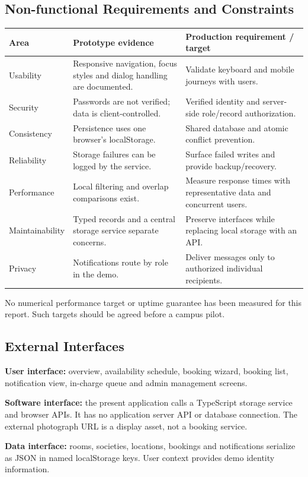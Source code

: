 \documentclass[11pt,a4paper]{report}
\begin{document}
\subsection{Non-functional Requirements and Constraints}
\begin{tabularx}{\textwidth}{@{}p{28mm}YY@{}}\toprule Area & Prototype evidence & Production requirement / target\\\midrule Usability & Responsive navigation, focus styles and dialog handling are documented. & Validate keyboard and mobile journeys with users.\\Security & Passwords are not verified; data is client-controlled. & Verified identity and server-side role/record authorization.\\Consistency & Persistence uses one browser's localStorage. & Shared database and atomic conflict prevention.\\Reliability & Storage failures can be logged by the service. & Surface failed writes and provide backup/recovery.\\Performance & Local filtering and overlap comparisons exist. & Measure response times with representative data and concurrent users.\\Maintainability & Typed records and a central storage service separate concerns. & Preserve interfaces while replacing local storage with an API.\\Privacy & Notifications route by role in the demo. & Deliver messages only to authorized individual recipients.\\\bottomrule\end{tabularx}
No numerical performance target or uptime guarantee has been measured for this report. Such targets should be agreed before a campus pilot.
\subsection{External Interfaces}
\textbf{User interface:} overview, availability schedule, booking wizard, booking list, notification view, in-charge queue and admin management screens.

\textbf{Software interface:} the present application calls a TypeScript storage service and browser APIs. It has no application server API or database connection. The external photograph URL is a display asset, not a booking service.

\textbf{Data interface:} rooms, societies, locations, bookings and notifications serialize as JSON in named localStorage keys. User context provides demo identity information.
\end{document}
